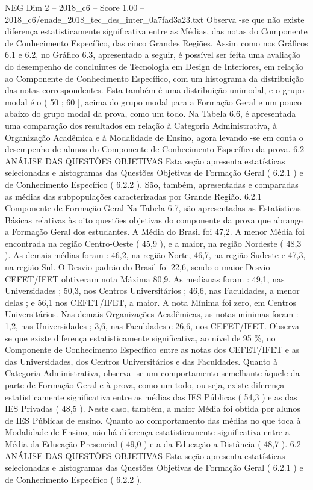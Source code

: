 \begin{textsample}{NEG Dim 2 – 2018\_c6 – Score 1.00 – 2018\_c6/enade\_2018\_tec\_des\_inter\_0a7fad3a23.txt}
Observa -se que não existe diferença estatisticamente significativa entre as Médias, das notas do Componente de Conhecimento Específico, das cinco Grandes Regiões.
Assim como nos Gráficos 6.1 e 6.2, no Gráfico 6.3, apresentado a seguir, é possível ser feita uma avaliação do desempenho de concluintes de Tecnologia em Design de Interiores, em relação ao Componente de Conhecimento Específico, com um histograma da distribuição das notas correspondentes.
Esta também é uma distribuição unimodal, e o grupo modal é o ( 50 ; 60 ], acima do grupo modal para a Formação Geral e um pouco abaixo do grupo modal da prova, como um todo.
Na Tabela 6.6, é apresentada uma comparação dos resultados em relação à Categoria Administrativa, à Organização Acadêmica e à Modalidade de Ensino, agora levando -se em conta o desempenho de alunos do Componente de Conhecimento Específico da prova. 6.2 ANÁLISE DAS QUESTÕES OBJETIVAS Esta seção apresenta estatísticas selecionadas e histogramas das Questões Objetivas de Formação Geral ( 6.2.1 ) e de Conhecimento Específico ( 6.2.2 ).
São, também, apresentadas e comparadas as médias das subpopulações caracterizadas por Grande Região. 6.2.1 Componente de Formação Geral Na Tabela 6.7, são apresentadas as Estatísticas Básicas relativas às oito questões objetivas do componente da prova que abrange a Formação Geral dos estudantes.
A Média do Brasil foi 47,2.
A menor Média foi encontrada na região Centro-Oeste ( 45,9 ), e a maior, na região Nordeste ( 48,3 ).
As demais médias foram : 46,2, na região Norte, 46,7, na região Sudeste e 47,3, na região Sul.
O Desvio padrão do Brasil foi 22,6, sendo o maior Desvio CEFET/IFET obtiveram nota Máxima 80,9.
As medianas foram : 49,1, nas Universidades ; 50,3, nos Centros Universitários ; 46,6, nas Faculdades, a menor delas ; e 56,1 nos CEFET/IFET, a maior.
A nota Mínima foi zero, em Centros Universitários.
Nas demais Organizações Acadêmicas, as notas mínimas foram : 1,2, nas Universidades ; 3,6, nas Faculdades e 26,6, nos CEFET/IFET.
Observa -se que existe diferença estatisticamente significativa, ao nível de 95 \%, no Componente de Conhecimento Específico entre as notas dos CEFET/IFET e as das Universidades, dos Centros Universitários e das Faculdades.
Quanto à Categoria Administrativa, observa -se um comportamento semelhante àquele da parte de Formação Geral e à prova, como um todo, ou seja, existe diferença estatisticamente significativa entre as médias das IES Públicas ( 54,3 ) e as das IES Privadas ( 48,5 ).
Neste caso, também, a maior Média foi obtida por alunos de IES Públicas de ensino.
Quanto ao comportamento das médias no que toca à Modalidade de Ensino, não há diferença estatisticamente significativa entre a Média da Educação Presencial ( 49,0 ) e a da Educação a Distância ( 48,7 ). 6.2 ANÁLISE DAS QUESTÕES OBJETIVAS Esta seção apresenta estatísticas selecionadas e histogramas das Questões Objetivas de Formação Geral ( 6.2.1 ) e de Conhecimento Específico ( 6.2.2 ).

\end{textsample}
